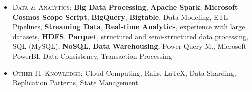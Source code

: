 \begin{itemize}
    \item \footnotesize{\textsc{Data \& Analytics}:}\scriptsize{ \textbf{Big Data Processing}, \textbf{Apache Spark}, \textbf{Microsoft Cosmos Scope Script}, \textbf{BigQuery}, \textbf{Bigtable}, Data Modeling, ETL Pipelines, \textbf{Streaming Data}, \textbf{Real-time Analytics}, experience with large datasets, \textbf{HDFS}, \textbf{Parquet}, structured and semi-structured data processing, SQL (MySQL), \textbf{NoSQL}, \textbf{Data Warehousing}, Power Query M., Microsoft PowerBI, Data Consistency, Transaction Processing}

    \item \footnotesize{\textsc{Other IT Knowledge}:}\scriptsize{ Cloud Computing, Rails, \LaTeX, Data Sharding, Replication Patterns, State Management}
\end{itemize}

    
    
    
